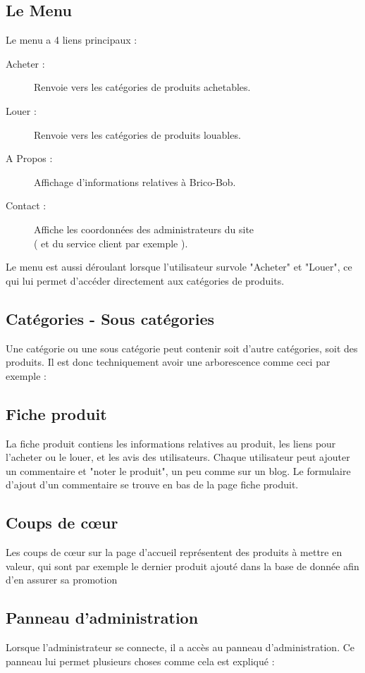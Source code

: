 \subsection{Le Menu}

	Le menu a 4 liens principaux : 
	\begin{description}
		\item[Acheter :] Renvoie vers les catégories de produits achetables.
		\item[Louer :] Renvoie vers les catégories de produits louables.
		\item[A Propos :] Affichage d'informations relatives à Brico-Bob.
		\item[Contact :] Affiche les coordonnées des administrateurs du site\\
		 ( et du service 	client par exemple ).
	\end{description}

	Le menu est aussi déroulant lorsque l'utilisateur survole "Acheter" et "Louer", 	ce qui lui permet d'accéder directement aux catégories de produits.
	
	\subsection{Catégories - Sous catégories}

	Une catégorie ou une sous catégorie peut contenir soit d'autre catégories, 	soit des produits. Il est donc techniquement avoir une arborescence comme ceci par exemple :
				
	\subsection{Fiche produit}

	La fiche produit contiens les informations relatives au produit, les liens pour l'acheter ou le louer, et les avis des utilisateurs.
Chaque utilisateur peut ajouter un commentaire et "noter le produit", un peu comme sur un blog. Le formulaire d'ajout d'un commentaire se trouve en
bas de la page fiche produit. 
		
	\subsection{Coups de cœur}

	Les coups de cœur sur la page d'accueil représentent des produits à mettre en valeur, qui sont par exemple le dernier produit ajouté dans la base de donnée afin d'en assurer sa promotion
		
	\subsection{Panneau d'administration}

	Lorsque l'administrateur se connecte, il a accès au panneau d'administration. Ce panneau lui permet plusieurs choses comme cela est expliqué :